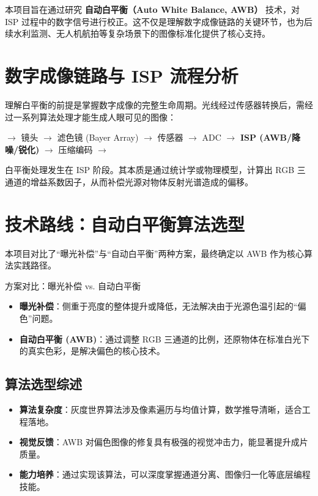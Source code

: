 \documentclass[12pt,a4paper,UTF8]{ctexart} %
\begin{document}
本项目旨在通过研究 \textbf{自动白平衡（Auto White Balance, AWB）} 技术，对 ISP 过程中的数字信号进行校正。这不仅是理解数字成像链路的关键环节，也为后续水利监测、无人机航拍等复杂场景下的图像标准化提供了核心支持。

\section{数字成像链路与 ISP 流程分析}

理解白平衡的前提是掌握数字成像的完整生命周期。光线经过传感器转换后，需经过一系列算法处理才能生成人眼可见的图像：

\begin{center}
 $\rightarrow$ 镜头 $\rightarrow$ 滤色镜 (Bayer Array) $\rightarrow$ 传感器 $\rightarrow$ ADC $\rightarrow$ \textbf{ISP (AWB/降噪/锐化)} $\rightarrow$ 压缩编码 $\rightarrow$ 
\end{center}

白平衡处理发生在 ISP 阶段。其本质是通过统计学或物理模型，计算出 RGB 三通道的增益系数因子，从而补偿光源对物体反射光谱造成的偏移。

\section{技术路线：自动白平衡算法选型}

本项目对比了“曝光补偿”与“自动白平衡”两种方案，最终确定以 AWB 作为核心算法实践路径。

\begin{mycompare}{方案对比：曝光补偿 vs. 自动白平衡}
    \begin{itemize}
        \item \textbf{曝光补偿}：侧重于亮度的整体提升或降低，无法解决由于光源色温引起的“偏色”问题。
        \item \textbf{自动白平衡 (AWB)}：通过调整 RGB 三通道的比例，还原物体在标准白光下的真实色彩，是解决偏色的核心技术。
    \end{itemize}
\end{mycompare}

\subsection{算法选型综述}
\begin{itemize}
    \item \textbf{算法复杂度}：灰度世界算法涉及像素遍历与均值计算，数学推导清晰，适合工程落地。
    \item \textbf{视觉反馈}：AWB 对偏色图像的修复具有极强的视觉冲击力，能显著提升成片质量。
    \item \textbf{能力培养}：通过实现该算法，可以深度掌握通道分离、图像归一化等底层编程技能。
\end{itemize}
\end{document}
